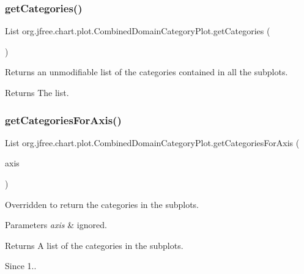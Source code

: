 \subsubsection{\texorpdfstring{get\+Categories()}{getCategories()}}
{\footnotesize\ttfamily List org.\+jfree.\+chart.\+plot.\+Combined\+Domain\+Category\+Plot.\+get\+Categories (\begin{DoxyParamCaption}{ }\end{DoxyParamCaption})}

Returns an unmodifiable list of the categories contained in all the subplots.

\begin{DoxyReturn}{Returns}
The list. 
\end{DoxyReturn}
\mbox{\label{classorg_1_1jfree_1_1chart_1_1plot_1_1_combined_domain_category_plot_ab0ae581ee1192a87e8784009ea7623fb}} 
\subsubsection{\texorpdfstring{get\+Categories\+For\+Axis()}{getCategoriesForAxis()}}
{\footnotesize\ttfamily List org.\+jfree.\+chart.\+plot.\+Combined\+Domain\+Category\+Plot.\+get\+Categories\+For\+Axis (\begin{DoxyParamCaption}\item[{\mbox{\hyperlink{classorg_1_1jfree_1_1chart_1_1axis_1_1_category_axis}{Category\+Axis}}}]{axis }\end{DoxyParamCaption})}

Overridden to return the categories in the subplots.


\begin{DoxyParams}{Parameters}
{\em axis} & ignored.\\
\hline
\end{DoxyParams}
\begin{DoxyReturn}{Returns}
A list of the categories in the subplots.
\end{DoxyReturn}
\begin{DoxySince}{Since}
1.. 
\end{DoxySince}
\mbox{\label{classorg_1_1jfree_1_1chart_1_1plot_1_1_combined_domain_category_plot_a128fef2bff06d3fbe79052b3546e9305}} 
